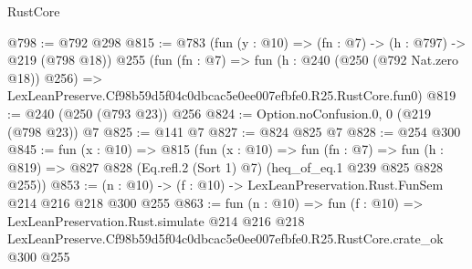 \begin{lexlean}{RustCore}
\begin{coremodule}
@798 := @792 @298
@815 := @783
    (fun (y : @10) => (fn : @7) -> (h : @797) -> @219 (@798 @18))
    @255
    (fun (fn : @7) =>
    fun (h : @240 (@250 (@792 Nat.zero @18)) @256) =>
    LexLeanPreserve.Cf98b59d5f04c0dbcac5e0ee007efbfe0.R25.RustCore.fun0)
@819 := @240 (@250 (@793 @23)) @256
@824 := Option.noConfusion.{0, 0} (@219 (@798 @23)) @7
@825 := @141 @7
@827 := @824 @825 @7
@828 := @254 @300
@845 := fun (x : @10) =>
  @815
    (fun (x : @10) =>
    fun (fn : @7) =>
    fun (h : @819) => @827 @828 (Eq.refl.{2} (Sort 1) @7) (heq_of_eq.{1} @239 @825 @828 @255))
@853 := (n : @10) -> (f : @10) -> LexLeanPreservation.Rust.FunSem @214 @216 @218 @300 @255
@863 := fun (n : @10) =>
  fun (f : @10) =>
  LexLeanPreservation.Rust.simulate
    @214
    @216
    @218
    LexLeanPreserve.Cf98b59d5f04c0dbcac5e0ee007efbfe0.R25.RustCore.crate_ok
    @300
    @255
\end{coremodule}
\end{lexlean}
